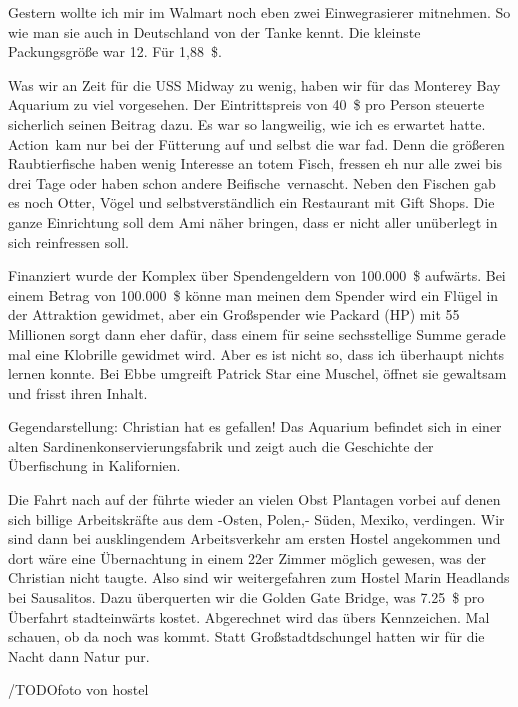 Gestern wollte ich mir im Walmart noch eben zwei Einwegrasierer mitnehmen.
So wie man sie auch in Deutschland von der Tanke kennt.
Die kleinste Packungsgröße war 12.
Für 1,88~\$.

Was wir an Zeit für die USS Midway zu wenig, haben wir für das Monterey Bay Aquarium zu viel vorgesehen.
Der Eintrittspreis von 40~\$ pro Person steuerte sicherlich seinen Beitrag dazu.
Es war so langweilig, wie ich es erwartet hatte.
\glqq Action\grqq \, kam nur bei der Fütterung auf und selbst die war fad.
Denn die größeren Raubtierfische haben wenig Interesse an totem Fisch, fressen eh nur alle zwei bis drei Tage oder haben schon andere \glqq Beifische\grqq \, vernascht.
Neben den Fischen gab es noch Otter, Vögel und selbstverständlich ein Restaurant mit Gift Shops.
Die ganze Einrichtung soll dem Ami näher bringen, dass er nicht aller unüberlegt in sich reinfressen soll.

Finanziert wurde der Komplex über Spendengeldern von 100.000~\$ aufwärts.
Bei einem Betrag von 100.000~\$ könne man meinen dem Spender wird ein Flügel in der Attraktion gewidmet, aber ein Großspender wie Packard (HP) mit 55 Millionen sorgt dann eher dafür, dass einem für seine sechsstellige Summe gerade mal eine Klobrille gewidmet wird.
Aber es ist nicht so, dass ich überhaupt nichts lernen konnte.
Bei Ebbe umgreift Patrick Star eine Muschel, öffnet sie gewaltsam und frisst ihren Inhalt.

Gegendarstellung: 
Christian hat es gefallen!
Das Aquarium befindet sich in einer alten Sardinenkonservierungsfabrik und zeigt auch die Geschichte der Überfischung in Kalifornien.

Die Fahrt nach  auf der  führte wieder an vielen Obst Plantagen vorbei auf denen sich billige Arbeitskräfte aus dem -Osten, Polen,- Süden, Mexiko, verdingen.
Wir sind dann bei ausklingendem Arbeitsverkehr am ersten Hostel angekommen und dort wäre eine Übernachtung in einem 22er Zimmer möglich gewesen, was der Christian nicht taugte.
Also sind wir weitergefahren zum Hostel Marin Headlands bei Sausalitos.
Dazu überquerten wir die Golden Gate Bridge, was 7.25~\$ pro Überfahrt stadteinwärts kostet.
Abgerechnet wird das übers Kennzeichen.
Mal schauen, ob da noch was kommt.
Statt Großstadtdschungel hatten wir für die Nacht dann Natur pur.

/TODO{foto von hostel}
